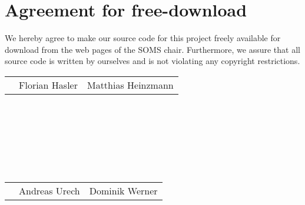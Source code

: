 \documentclass[11pt]{article}
\begin{document}

\newpage


\newpage
\section*{Agreement for free-download}
\bigskip


\bigskip


\large We hereby agree to make our source code for this project freely available for download from the web pages of the SOMS chair. Furthermore, we assure that all source code is written by ourselves and is not violating any copyright restrictions.

\begin{center}

\bigskip


\bigskip


\begin{tabular}{@{}p{3.3cm}@{}p{6cm}@{}@{}p{6cm}@{}}
\begin{minipage}{3cm}

\end{minipage}
&
\begin{minipage}{6cm}
\vspace{2mm} 

\large Florian Hasler

\end{minipage}
&
\begin{minipage}{6cm}

\large Matthias Heinzmann

\end{minipage}
\end{tabular}
\ \\
\ \\
\ \\
\ \\
\ \\
\ \\
\begin{tabular}{@{}p{3.3cm}@{}p{6cm}@{}@{}p{6cm}@{}}
\begin{minipage}{3cm}

\end{minipage}
&
\begin{minipage}{6cm}
\vspace{2mm} \large Andreas Urech

 \vspace{\baselineskip}

\end{minipage}
&
\begin{minipage}{6cm}

\large Dominik Werner

\end{minipage}
\end{tabular}


\end{center}
\newpage
\end{document}
